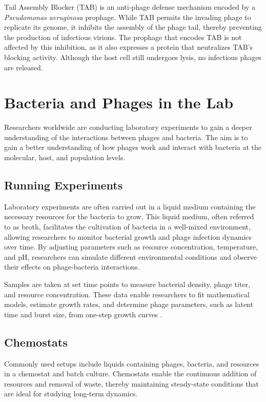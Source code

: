 Tail Assembly Blocker (TAB) is an anti-phage defense mechanism encoded by a \textit{Pseudomonas aeruginosa} prophage. 
While TAB permits the invading phage to replicate its genome, it inhibits the assembly of the phage tail, thereby preventing the production of infectious virions. 
The prophage that encodes TAB is not affected by this inhibition, as it also expresses a protein that neutralizes TAB's blocking activity. 
Although the host cell still undergoes lysis, no infectious phages are released.

\section{Bacteria and Phages in the Lab}
Researchers worldwide are conducting laboratory experiments to gain a deeper understanding of the interactions between phages and bacteria. 
The aim is to gain a better understanding of how phages work and interact with bacteria at the molecular, host, and population levels. 

\subsection{Running Experiments}
Laboratory experiments are often carried out in a liquid medium containing the necessary resources for the bacteria to grow. 
This liquid medium, often referred to as broth, facilitates the cultivation of bacteria in a well-mixed environment, allowing researchers to monitor bacterial growth and phage infection dynamics over time. 
By adjusting parameters such as resource concentration, temperature, and pH, researchers can simulate different environmental conditions and observe their effects on phage-bacteria interactions. 

Samples are taken at set time points to measure bacterial density, phage titer, and resource concentration. 
These data enable researchers to fit mathematical models, estimate growth rates, and determine phage parameters, such as latent time and burst size, from one-step growth curves \cite{gengUsingBacterialPopulation2024, mullaExtremeDiversityPhage2024}.

\subsection{Chemostats}
Commonly used setups include liquids containing phages, bacteria, and resources in a chemostat and batch culture. 
Chemostats enable the continuous addition of resources and removal of waste, thereby maintaining steady-state conditions that are ideal for studying long-term dynamics.

